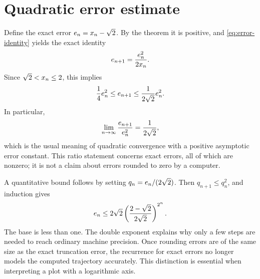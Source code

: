 \section{Quadratic error estimate}\label{sec:error}
Define the exact error $e_n=x_n-\sqrt{2}$. By the theorem it is positive, and
\eqref{eq:error-identity} yields the exact identity
\begin{equation}\label{eq:quadratic}
e_{n+1}=\frac{e_n^2}{2x_n}.
\end{equation}
Since $\sqrt{2}<x_n\leq2$, this implies
\[\frac14e_n^2\leq e_{n+1}\leq\frac{1}{2\sqrt{2}}e_n^2.\]
In particular,
\[\lim_{n\to\infty}\frac{e_{n+1}}{e_n^2}=\frac{1}{2\sqrt{2}},\]
which is the usual meaning of quadratic convergence with a positive asymptotic
error constant. This ratio statement concerns exact errors, all of which are
nonzero; it is not a claim about errors rounded to zero by a computer.

A quantitative bound follows by setting $q_n=e_n/(2\sqrt{2})$.
Then $q_{n+1}\leq q_n^2$, and induction gives
\[e_n\leq2\sqrt{2}\left(\frac{2-\sqrt{2}}{2\sqrt{2}}\right)^{2^n}.\]
The base is less than one. The double exponent explains why only a few steps
are needed to reach ordinary machine precision. Once rounding errors are of
the same size as the exact truncation error, the recurrence for exact errors
no longer models the computed trajectory accurately. This distinction is
essential when interpreting a plot with a logarithmic axis.
